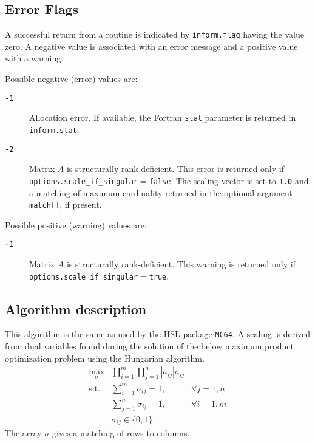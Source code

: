 
\subsection{Error Flags} \label{returns:hungarian}
A successful return from a routine is indicated by \texttt{inform.flag} having the value zero. A negative value is associated with an error message and a positive value with a warning.

Possible negative (error) values are:
\begin{description}
\item[\texttt{-1}] Allocation error. If available, the Fortran \texttt{stat} parameter is returned in \texttt{inform.stat}.
\item[\texttt{-2}] Matrix $A$ is structurally rank-deficient. This error is
   returned only if
   \texttt{options.scale\_if\_singular}$=$\texttt{false}. The scaling vector
   is set to \texttt{1.0} and a matching of maximum cardinality returned
   in the optional argument \texttt{match[]}, if present.
\end{description}

Possible positive (warning) values are:
\begin{description}
\item[\texttt{+1}] Matrix $A$ is structurally rank-deficient. This warning is
   returned only if
   \texttt{options.scale\_if\_singular}$=$\texttt{true}.
\end{description}

\subsection{Algorithm description}

This algorithm is the same as used by the HSL package \texttt{MC64}. A scaling
is derived from dual variables found during the solution of the below
maximum product optimization problem using the Hungarian algorithm.
\begin{eqnarray*}
   \max_{\sigma} & \prod_{i=1}^m\prod_{j=1}^n |a_{ij}|\sigma_{ij} & \\
   \mathrm{s.t.} & \sum_{i=1}^m\sigma_{ij} = 1, & \forall j=1,n \\
                 & \sum_{j=1}^n\sigma_{ij} = 1, & \forall i=1,m \\
                 & \sigma_{ij} \in \{0,1\}.
\end{eqnarray*}
The array $\sigma$ gives a matching of rows to columns.


